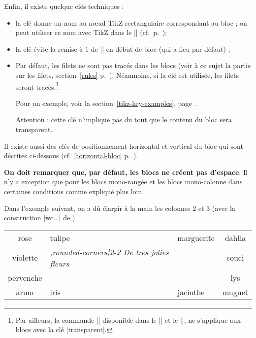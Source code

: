 \documentclass[dvipsnames]{article}%
\def\interitem{\vspace{7mm plus 2 mm minus 3mm}}
\begin{document}
\medskip
Enfin, il existe quelque clés techniques :
\begin{itemize}
\item {}
la clé  donne un nom au nœud TikZ rectangulaire
correspondant au bloc ; on peut utiliser ce nom avec TikZ dans le |\CodeAfter|
(cf.~p.~\pageref{code-after});
\item {}
la clé  évite la remise à $1$ de
|\arraystretch| en début de bloc (qui a lieu par défaut) ;
\item {}
Par défaut, les filets ne sont pas tracés dans les blocs (voir à ce sujet
la partie sur les filets, section~\ref{rules} p.~\pageref{rules}). Néanmoins, si
la clé  est utilisée, les filets seront tracés.\footnote{Par
ailleurs, la commande |\TikzEveryCell| disponible dans le |\CodeAfter| et le
|\CodeBefore|, ne s'applique aux blocs avec la clé |transparent|.}

Pour un exemple, voir la section~\ref{tikz-key-examples},
page~\pageref{tikz-key-examples}. 

Attention : cette clé n'implique pas du tout que le contenu du bloc sera
transparent.
\end{itemize}

Il existe aussi des clés de positionnement horizontal et vertical du bloc qui
sont décrites ci-dessous (cf. \ref{horizontal-bloc} p.~\pageref{horizontal-bloc}).


\interitem
\textbf{On doit remarquer que, par défaut, les blocs ne créent pas d'espace}. Il
n'y a exception que pour les blocs mono-rangée et les blocs mono-colonne dans
certaines conditions comme expliqué plus loin.


\medskip
Dans l'exemple suivant, on a dû élargir à la main les colonnes 2 et 3 (avec la
construction |w{c}{...}| de ).

\medskip
\begin{Code}
\begin{NiceTabular}{cw{c}{2cm}w{c}{3cm}c}
rose      & tulipe & marguerite & dahlia \\
violette
& \emph{\Block[draw=red,fill=[RGB]{204,204,255},rounded-corners]{2-2}
        {\LARGE De très jolies fleurs}}
   & & souci \\
pervenche & & & lys \\
arum      & iris & jacinthe & muguet
\end{NiceTabular}
\end{Code}
\end{document}
